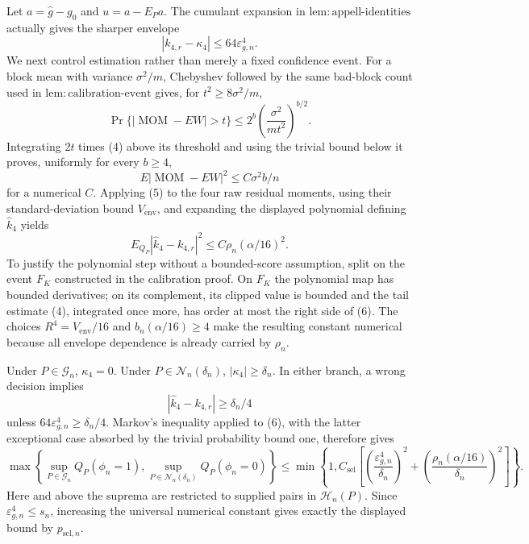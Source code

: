 Let \(a=\widehat g-g_0\) and \(u=a-E_Pa\).  The cumulant expansion in \(\mathrm{lem:appell\mbox{-}identities}\) actually gives the sharper envelope
\[
|k_{4,r}-\kappa_4|
\le64\varepsilon_{g,n}^4.
\tag{3}
\]
We next control estimation rather than merely a fixed confidence event.  For a block mean with variance \(\sigma^2/m\), Chebyshev followed by the same bad-block count used in \(\mathrm{lem:calibration\mbox{-}event}\) gives, for \(t^2\ge8\sigma^2/m\),
\[
\Pr\{|\operatorname{MOM}-EW|>t\}
\le2^b\left(\frac{\sigma^2}{mt^2}\right)^{b/2}.
\tag{4}
\]
Integrating \(2t\) times (4) above its threshold and using the trivial bound below it proves, uniformly for every \(b\ge4\),
\[
E|\operatorname{MOM}-EW|^2\le C\sigma^2 b/n
\tag{5}
\]
for a numerical \(C\).  Applying (5) to the four raw residual moments, using their standard-deviation bound \(V_{\mathrm{env}}\), and expanding the displayed polynomial defining \(\widehat k_4\) yields
\[
E_{Q_P}|\widehat k_4-k_{4,r}|^2
\le C\rho_n(\alpha/16)^2.
\tag{6}
\]
To justify the polynomial step without a bounded-score assumption, split on the event \(F_K\) constructed in the calibration proof.  On \(F_K\) the polynomial map has bounded derivatives; on its complement, its clipped value is bounded and the tail estimate (4), integrated once more, has order at most the right side of (6).  The choices \(R^4=V_{\mathrm{env}}/16\) and \(b_n(\alpha/16)\ge4\) make the resulting constant numerical because all envelope dependence is already carried by \(\rho_n\).

Under \(P\in\mathcal G_n\), \(\kappa_4=0\).  Under \(P\in\mathcal N_n(\delta_n)\), \(|\kappa_4|\ge\delta_n\).  In either branch, a wrong decision implies
\[
|\widehat k_4-k_{4,r}|
\ge\delta_n/4
\]
unless \(64\varepsilon_{g,n}^4\ge\delta_n/4\).  Markov's inequality applied to (6), with the latter exceptional case absorbed by the trivial probability bound one, therefore gives
\[
\max\left\{
\sup_{P\in\mathcal G_n}Q_P(\phi_n=1),
\sup_{P\in\mathcal N_n(\delta_n)}Q_P(\phi_n=0)
\right\}
\le\min\left\{1,C_{\mathrm{sel}}\left[
\left(\frac{\varepsilon_{g,n}^4}{\delta_n}\right)^2
+\left(\frac{\rho_n(\alpha/16)}{\delta_n}\right)^2
\right]\right\}.
\]
Here and above the suprema are restricted to supplied pairs in \(\mathcal H_n(P)\).  Since \(\varepsilon_{g,n}^4\le s_n\), increasing the universal numerical constant gives exactly the displayed bound by \(p_{\mathrm{sel},n}\).

